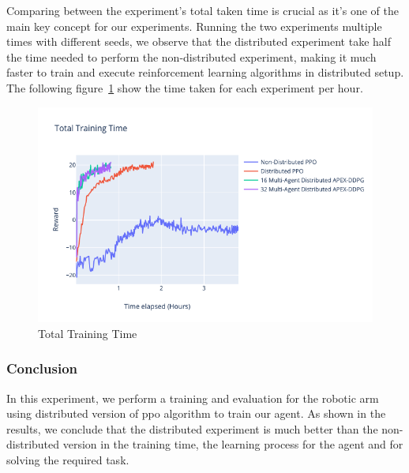 Comparing between the experiment's total taken time is crucial as it's one of the main key concept for our experiments. Running the two experiments multiple times with different seeds, we observe that the distributed experiment take half the time needed to perform the non-distributed experiment, making it much faster to train and execute reinforcement learning algorithms in distributed setup. The following figure~\ref{fig:3rd_exp_total_training_time} show the time taken for each experiment per hour.
\begin{figure}[!htb]
		\centering
		\includegraphics[width=\linewidth]{figures/exps/3rd_exp/total_training_time.png}
		\caption{Total Training Time}
		\label{fig:3rd_exp_total_training_time}
\end{figure}


\subsubsection{Conclusion}

In this experiment, we perform a training and evaluation for the robotic arm using distributed version of ppo algorithm to train our agent. As shown in the results, we conclude that the distributed experiment is much better than the non-distributed version in the training time, the learning process for the agent and for solving the required task.